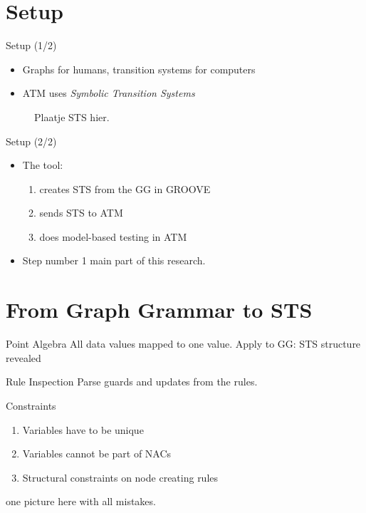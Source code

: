 \documentclass{FMTslides}
\begin{document}
\makecontentsslide

\section[Setup]{Setup}

\begin{frame}{Setup (1/2)}
\begin{itemize}[<+->]
  \item Graphs for humans, transition systems for computers
  \item ATM uses \textit{Symbolic Transition Systems}
\end{itemize}
\begin{figure}
Plaatje STS hier. %
\end{figure}
\end{frame}

\begin{frame}{Setup (2/2)}
\begin{itemize}[<+->]
  \item The tool:
  \begin{enumerate}
    \item creates STS from the GG in GROOVE
    \item sends STS to ATM
    \item does model-based testing in ATM
  \end{enumerate}
  \item Step number 1 main part of this research.
\end{itemize}
\end{frame}

\section[GG2STS]{From Graph Grammar to STS}

\begin{frame}{Point Algebra}
All data values mapped to one value.
Apply to GG: STS structure revealed
\end{frame}

\begin{frame}{Rule Inspection}
Parse guards and updates from the rules.
\end{frame}

\begin{frame}{Constraints}
  \begin{enumerate}[<+->]
    \item Variables have to be unique
    \item Variables cannot be part of NACs
    \item Structural constraints on node creating rules
  \end{enumerate}
  one picture here with all mistakes.
\end{frame}
\end{document}
